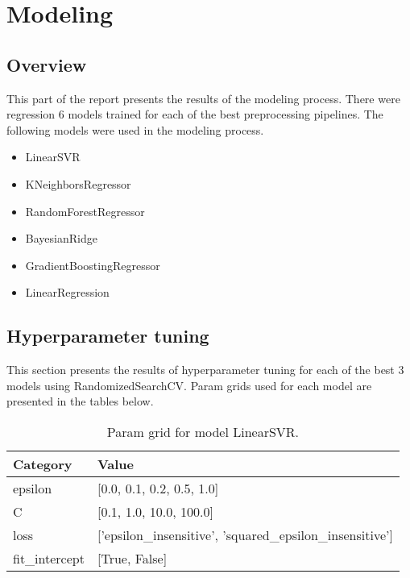 \documentclass{article}%
\begin{document}
%
\section{Modeling}%
\label{sec:Modeling}%

%
\subsection{Overview}%
\label{subsec:Overview}%

%
This part of the report presents the results of the modeling process. There were regression 6 models trained for each of the best preprocessing pipelines.%
The following models were used in the modeling process.%
\begin{itemize}%
\item%
LinearSVR%
\item%
KNeighborsRegressor%
\item%
RandomForestRegressor%
\item%
BayesianRidge%
\item%
GradientBoostingRegressor%
\item%
LinearRegression%
\end{itemize}%
\subsection{Hyperparameter tuning}%
\label{subsec:Hyperparametertuning}%

%
This section presents the results of hyperparameter tuning for each of the best 3 models using RandomizedSearchCV. Param grids used for each model are presented in the tables below.%


\begin{table}[H]%
\begin{center}%
\renewcommand{\arraystretch}{1.5}%
\begin{tabular}{l l}%
\hline%
\textbf{Category}&\textbf{Value}\\%
\hline%
epsilon&{[}0.0, 0.1, 0.2, 0.5, 1.0{]}\\%
C&{[}0.1, 1.0, 10.0, 100.0{]}\\%
loss&{[}'epsilon\_insensitive', 'squared\_epsilon\_insensitive'{]}\\%
fit\_intercept&{[}True, False{]}\\%
\hline%
\end{tabular}%
\end{center}%
\caption{Param grid for model LinearSVR.}%
\end{table}
\end{document}
